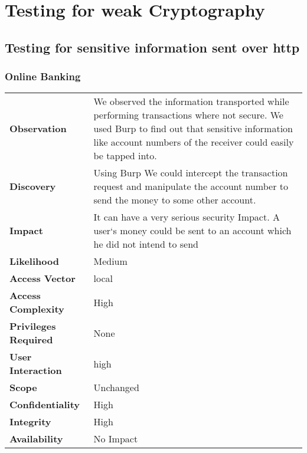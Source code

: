 \section{Testing for weak Cryptography}

\subsection{Testing for sensitive information sent over http}

\subsubsection{Online Banking}
\begin{tabular}{l|p{10cm}}

\textbf{Observation} &  We observed the information transported while performing transactions where not secure. We used Burp to find out that sensitive information like account numbers of the receiver could easily be tapped into. \\
\textbf{Discovery} & Using Burp We could intercept the transaction request and manipulate the account number to send the money to some other account. \\
\textbf{Impact} & It can have a very serious security Impact. A user`s money could be sent to an account which he did not intend to send \\
\textbf{Likelihood} & Medium \\
\textbf{Access Vector} & local \\
\textbf{Access Complexity} & High \\
\textbf{Privileges Required} & None \\
\textbf{User Interaction} & high \\
\textbf{Scope} & Unchanged \\
\textbf{Confidentiality} & High \\
\textbf{Integrity} & High \\
\textbf{Availability} & No Impact \\
\end{tabular}

